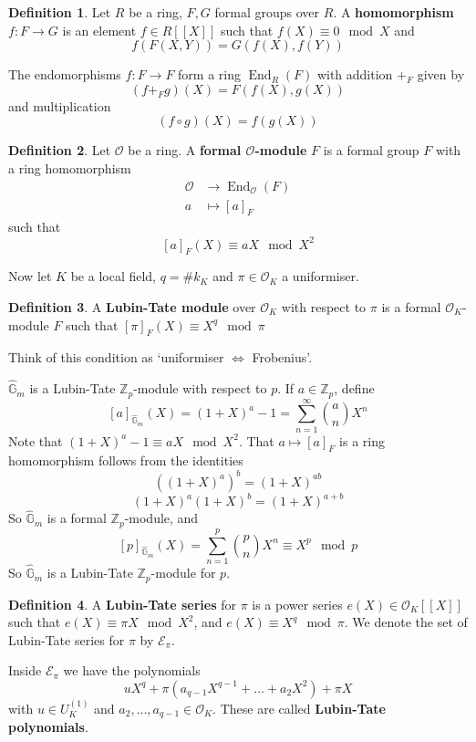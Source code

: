 \documentclass[a4paper]{article}
\theoremstyle{definition}
\newtheorem{definition}{Definition}
\theoremstyle{default}
\theoremstyle{remark}
\DeclareMathOperator{\End}{End}
\begin{document}
\begin{definition}
	Let $R$ be a ring, $F, G$ formal groups over $R$.
	A \textbf{homomorphism} $f: F \to G$ is an element $f \in R[[X]]$ such that $f(X) \equiv 0 \mod X$ and 
	$$f(F(X, Y)) = G(f(X), f(Y))$$
	
	The endomorphisms $f: F \to F$ form a ring $\End_R(F)$
	with addition $+_F$ given by
	$$(f +_F g)(X) = F(f(X), g(X))$$
	and multiplication
	$$(f \circ g)(X) = f(g(X))$$
\end{definition}

\begin{definition}
	Let $\mathcal{O}$ be a ring.
	A \textbf{formal $\mathbf{\mathcal{O}}$-module} $F$ is a formal group $F$ with a ring homomorphism
	\begin{align*}
		\mathcal{O} & \rightarrow \End_\mathcal{O}(F) \\
		a &\mapsto [a]_F
	\end{align*}
	such that
	$$[a]_F(X) \equiv aX \mod X^2$$
\end{definition}

Now let $K$ be a local field,
$q = \# k_K$ and $\pi \in \mathcal{O}_K$ a uniformiser.

\begin{definition}
	A \textbf{Lubin-Tate module} over $\mathcal{O}_K$ with respect to $\pi$
	is a formal $\mathcal{O}_K$-module $F$ such that
	$[\pi]_F(X) \equiv X^q \mod \pi$
\end{definition}

Think of this condition as `uniformiser $\iff$ Frobenius'.

$\hat{\mathbb{G}}_m$ is a Lubin-Tate $\mathbb{Z}_p$-module with respect to $p$.
If $a \in \mathbb{Z}_p$, define
$$[a]_{\hat{\mathbb{G}}_m}(X) = (1+X)^a-1 = \sum_{n=1}^\infty {a \choose n}X^n$$
Note that $(1+X)^a-1 \equiv aX \mod X^2$.
That $a \mapsto [a]_F$ is a ring homomorphism follows from the identities
$$((1+X)^a)^b = (1+X)^{ab}$$
$$(1+X)^a(1+X)^b = (1+X)^{a+b}$$
So $\hat{\mathbb{G}}_m$ is a formal $\mathbb{Z}_p$-module, and
$$[p]_{\hat{\mathbb{G}}_m}(X) = \sum_{n=1}^p {p \choose n} X^n \equiv X^p \mod p$$
So $\hat{\mathbb{G}}_m$ is a Lubin-Tate $\mathbb{Z}_p$-module for $p$.

\begin{definition}
	A \textbf{Lubin-Tate series} for $\pi$ is a power series $e(X) \in \mathcal{O}_K[[X]]$
	such that $e(X) \equiv \pi X \mod X^2$,
	and $e(X) \equiv X^q \mod \pi$.
	We denote the set of Lubin-Tate series for $\pi$ by $\mathcal{E}_\pi$.
	
	Inside $\mathcal{E}_\pi$ we have the polynomials
	$$uX^q + \pi(a_{q-1}X^{q-1} + \dots + a_2 X^2) + \pi X$$
	with $u \in U_K^{(1)}$ and $a_2, \dots, a_{q-1} \in \mathcal{O}_K$.
	These are called \textbf{Lubin-Tate polynomials}.
\end{definition}
\end{document}
